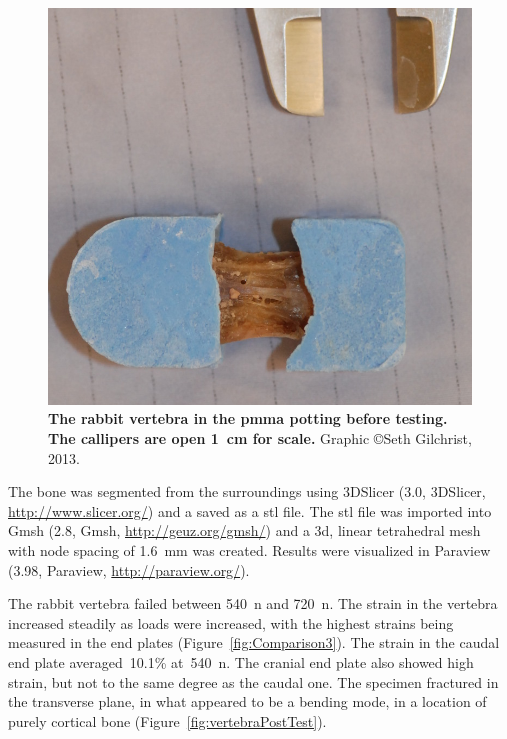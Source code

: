 \begin{figure}
\centering
\includegraphics[width=0.7\linewidth]{./appendixDvc/figures/vertebraPretest}
\caption[Rabbit vertebra before testing]{\textbf{The rabbit vertebra in the \acs*{pmma} potting before testing. The callipers are open 1~\ac{cm} for scale.} Graphic \copyright Seth Gilchrist, 2013.}
\label{fig:vertebraPretest}
\end{figure}

The bone was segmented from the surroundings using 3DSlicer (3.0, 3DSlicer, \url{http://www.slicer.org/}) and a saved as a \ac{stl} file.
The \ac{stl} file was imported into Gmsh (2.8, Gmsh, \url{http://geuz.org/gmsh/}) and a \ac{3d}, linear tetrahedral mesh with node spacing of 1.6~\ac{mm} was created.
Results were visualized in Paraview (3.98, Paraview, \url{http://paraview.org/}).

The rabbit vertebra failed between 540~\ac{n} and 720~\ac{n}.
The strain in the vertebra increased steadily as loads were increased, with the highest strains being measured in the end plates (Figure~\ref{fig:Comparison3}).
The strain in the caudal end plate averaged~10.1\% at~540~\ac{n}.
The cranial end plate also showed high strain, but not to the same degree as the caudal one.
The specimen fractured in the transverse plane, in what appeared to be a bending mode, in a location of purely cortical bone (Figure~\ref{fig:vertebraPostTest}).

